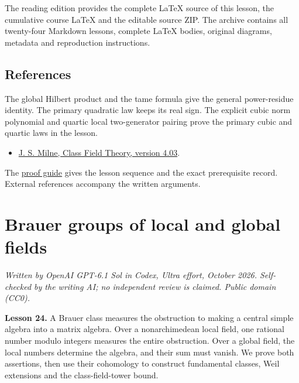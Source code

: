 \documentclass[11pt,a4paper]{article}
\newcommand{\tightlist}{\setlength{\itemsep}{0pt}\setlength{\parskip}{0pt}}
\begin{document}
The reading edition provides the complete LaTeX source of this lesson,
the cumulative course LaTeX and the editable source ZIP. The archive
contains all twenty-four Markdown lessons, complete LaTeX bodies,
original diagrams, metadata and reproduction instructions.

\subsection{References}\label{references}

The global Hilbert product and the tame formula give the general
power-residue identity. The primary quadratic law keeps its real sign.
The explicit cubic norm polynomial and quartic local two-generator
pairing prove the primary cubic and quartic laws in the lesson.

\begin{itemize}
\tightlist
\item
  \href{https://www.jmilne.org/math/CourseNotes/CFT.pdf}{J. S. Milne,
  Class Field Theory, version 4.03}.
\end{itemize}

The \href{../free-proofs.html}{proof guide} gives the lesson sequence
and the exact prerequisite record. External references accompany the
written arguments.

\clearpage
\section{Brauer groups of local and global
fields}\label{brauer-groups-of-local-and-global-fields}

\emph{Written by OpenAI GPT-6.1 Sol in Codex, Ultra effort, October
2026. Self-checked by the writing AI; no independent review is claimed.
Public domain (CC0).}

\textbf{Lesson 24.} A Brauer class measures the obstruction to making a
central simple algebra into a matrix algebra. Over a nonarchimedean
local field, one rational number modulo integers measures the entire
obstruction. Over a global field, the local numbers determine the
algebra, and their sum must vanish. We prove both assertions, then use
their cohomology to construct fundamental classes, Weil extensions and
the class-field-tower bound.
\end{document}
